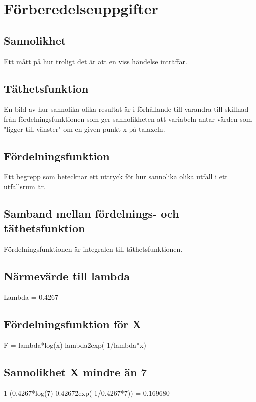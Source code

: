 \documentclass{article}
\begin{document}
\section*{Förberedelseuppgifter}

\addtocounter{section}{1}

\subsection{Sannolikhet}

Ett mått på hur troligt det är att en viss händelse inträffar.

\subsection{Täthetsfunktion}

En bild av hur sannolika olika resultat är i förhållande till varandra till
skillnad från fördelningsfunktionen som ger sannolikheten att variabeln antar
värden som "ligger till vänster" om en given punkt x på talaxeln.

\subsection{Fördelningsfunktion}

Ett begrepp som betecknar ett uttryck för hur sannolika olika utfall i ett
utfallsrum är.

\subsection{Samband mellan fördelnings- och täthetsfunktion}

Fördelningsfunktionen är integralen till täthetsfunktionen.

\addtocounter{section}{1}

\subsection{Närmevärde till lambda}
Lambda = 0.4267
\subsection{Fördelningsfunktion för X}
F = lambda*log(x)-lambda\^2exp(-1/lambda*x)
\subsection{Sannolikhet X mindre än 7}
1-(0.4267*log(7)-0.4267\^2exp(-1/0.4267*7)) = 0.169680
\end{document}
